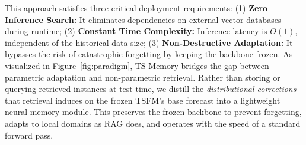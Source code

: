 


This approach satisfies three critical deployment requirements: (1) \textbf{Zero Inference Search:} It eliminates dependencies on external vector databases during runtime; (2) \textbf{Constant Time Complexity:} Inference latency is $O(1)$, independent of the historical data size; (3) \textbf{Non-Destructive Adaptation:} It bypasses the risk of catastrophic forgetting by keeping the backbone frozen. As visualized in Figure~\ref{fig:paradigm}, TS-Memory bridges the gap between parametric adaptation and non-parametric retrieval. Rather than storing or querying retrieved instances at test time, we distill the \emph{distributional corrections} that retrieval induces on the frozen TSFM's base forecast into a lightweight neural memory module. This preserves the frozen backbone to prevent forgetting, adapts to local domains as RAG does, and operates with the speed of a standard forward pass.

